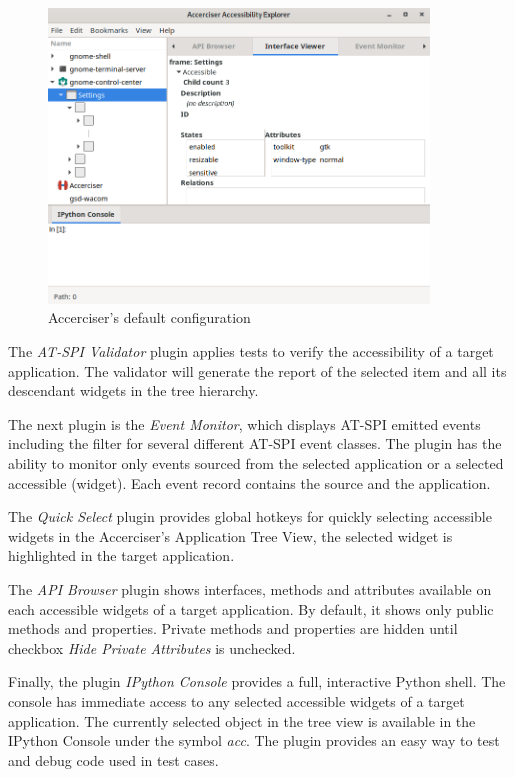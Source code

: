 \begin{figure}[hbt]
	\centering
	\includegraphics[width=0.9\textwidth]{obrazky-figures/accerciser.png}
	\caption{Accerciser's default configuration}
	\label{Accerciser_img}
\end{figure}

The \textit{AT-SPI Validator} plugin applies tests to verify the accessibility of a target application. The validator will generate the report of the selected item and all its descendant widgets in the tree hierarchy.

The next plugin is the \textit{Event Monitor}, which displays AT-SPI emitted events including the filter for several different AT-SPI event classes. The plugin has the ability to monitor only events sourced from the selected application or a selected accessible (widget). Each event record contains the source and the application.

The \textit{Quick Select} plugin provides global hotkeys for quickly selecting accessible widgets in the Accerciser's Application Tree View, the selected widget is highlighted in the target application.

The \textit{API Browser} plugin shows interfaces, methods and attributes available on each accessible widgets of a target application. By default, it shows only public methods and properties. Private methods and properties are hidden until checkbox \textit{Hide Private Attributes} is unchecked.
 
Finally, the plugin \textit{IPython Console} provides a full, interactive Python shell. The console has immediate access to any selected accessible widgets of a target application. The currently selected object in the tree view is available in the IPython Console under the symbol \textit{acc}. The plugin provides an easy way to test and debug code used in test cases.    
